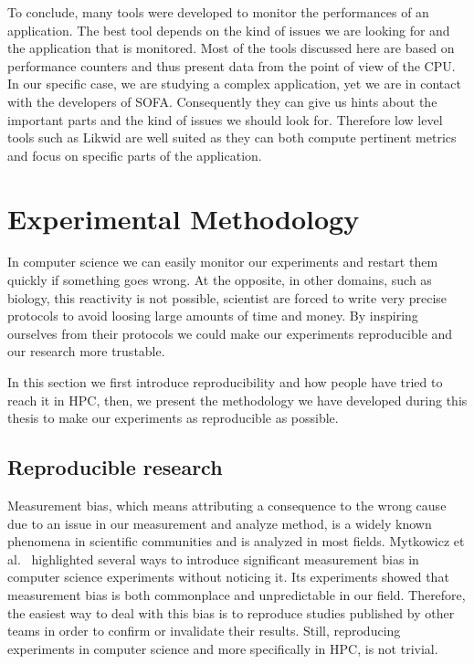 To conclude, many tools were developed to monitor the performances of an application.
The best tool depends on the kind of issues we are looking for and the application that is monitored.
Most of the tools discussed here are based on performance counters and thus present data from the point of view of the \gls{CPU}.
In our specific case, we are studying a complex application, yet we are in contact with the developers of \gls{SOFA}.
Consequently they can give us hints about the important parts and the kind of issues we should look for.
Therefore low level tools such as \gls{Likwid} are well suited as they can both compute pertinent metrics and focus on specific parts of the application.

\section{Experimental Methodology}
\label{sec:expe-methodo}

In computer science we can easily monitor our experiments and restart them quickly if something goes wrong.
At the opposite, in other domains, such as biology,  this reactivity is not possible, scientist are forced to write very precise protocols to avoid loosing large amounts of time and money.
By inspiring ourselves from their protocols we could make our experiments reproducible and our research more trustable.

In this section we first introduce reproducibility and how people have tried to reach it in \gls{HPC}, then, we present the methodology we have developed during this thesis to make our experiments as reproducible as possible.


\subsection{Reproducible research}

Measurement bias, which means attributing a consequence to the wrong cause due to an issue in our measurement and analyze method, is a widely known phenomena in scientific communities and is analyzed in most fields.
Mytkowicz et al.~\cite{Mytkowicz09Producing} highlighted several ways to introduce significant measurement bias in computer science experiments without noticing it.
Its experiments showed that measurement bias is both commonplace and unpredictable in our field.
Therefore, the easiest way to deal with this bias is to reproduce studies published by other teams in order to confirm or invalidate their results.
Still, reproducing experiments in computer science and more specifically in \gls{HPC}, is not trivial.

